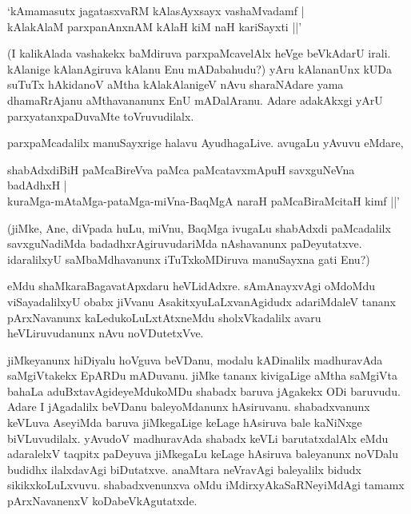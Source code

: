 \begin{shloka}
`kAmamasutx jagatasxvaRM kAlasAyxsayx vashaMvadamf |\\
kAlakAlaM parxpanAnxnAM kAlaH kiM naH kariSayxti ||'
\end{shloka}

(I kalikAlada vashakekx baMdiruva parxpaMcavelAlx heVge beVkAdarU irali. kAlanige kAlanAgiruva kAlanu Enu mADabahudu?) yAru kAlananUnx kUDa suTuTx hAkidanoV aMtha kAlakAlanigeV nAvu sharaNAdare yama dhamaRrAjanu aMthavananunx EnU mADalAranu. Adare adakAkxgi yArU parxyatanxpaDuvaMte toVruvudilalx.

parxpaMcadalilx manuSayxrige halavu AyudhagaLive. avugaLu yAvuvu eMdare,

\begin{shloka}
shabAdxdiBiH paMcaBireVva paMca paMcatavxmApuH savxguNeVna badAdhxH |\\
kuraMga-mAtaMga-pataMga-miVna-BaqMgA naraH paMcaBiraMcitaH kimf ||'
\end{shloka}

(jiMke, Ane, diVpada huLu, miVnu, BaqMga ivugaLu shabAdxdi paMcadalilx savxguNadiMda badadhxrAgiruvudariMda nAshavanunx paDeyutatxve. idaralilxyU saMbaMdhavanunx iTuTxkoMDiruva manuSayxna gati Enu?)

eMdu shaMkaraBagavatApxdaru heVLidAdxre. sAmAnayxvAgi oMdoMdu viSayadalilxyU obabx jiVvanu AsakitxyuLaLxvanAgidudx adariMdaleV tananx pArxNavanunx kaLedukoLuLxtAtxneMdu sholxVkadalilx avaru heVLiruvudanunx nAvu noVDutetxVve.

jiMkeyanunx hiDiyalu hoVguva beVDanu, modalu kADinalilx madhuravAda saMgiVtakekx EpARDu mADuvanu. jiMke tananx kivigaLige aMtha saMgiVta bahaLa aduBxtavAgideyeMdukoMDu shabadx baruva jAgakekx ODi baruvudu. Adare I jAgadalilx beVDanu baleyoMdanunx hAsiruvanu. shabadxvanunx keVLuva AseyiMda baruva jiMkegaLige keLage hAsiruva bale kaNiNxge biVLuvudilalx. yAvudoV madhuravAda shabadx keVLi barutatxdalAlx eMdu adaralelxV taqpitx paDeyuva jiMkegaLu keLage hAsiruva baleyanunx noVDalu budidhx ilalxdavAgi biDutatxve. anaMtara neVravAgi baleyalilx bidudx sikikxkoLuLxvuvu. shabadxvenunxva oMdu iMdirxyAkaSaRNeyiMdAgi tamamx pArxNavanenxV koDabeVkAgutatxde.

